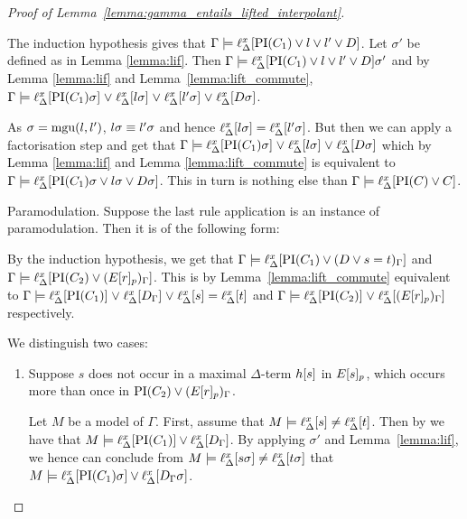 \begin{proof}[Proof of Lemma~\ref{lemma:gamma_entails_lifted_interpolant}]
\begin{description}
			The induction hypothesis gives that
			$\Gamma \models \ell_{\Delta}^{x}[\operatorname{PI}(C_1) \lor l \lor l' \lor D]$.
			Let $\sigma'$ be defined as in Lemma \ref{lemma:lif}.
			Then $\Gamma \models \ell_{\Delta}^{x}[\operatorname{PI}(C_1) \lor l \lor l' \lor D]\sigma'$ and by Lemma \ref{lemma:lif} and Lemma~\ref{lemma:lift_commute},
			$\Gamma \models \ell_{\Delta}^{x}[\operatorname{PI}(C_1)\sigma] \;{\lor}\; \ell_{\Delta}^{x}[l\sigma] \;{\lor}\; \ell_{\Delta}^{x}[l'\sigma] \;{\lor}\; \ell_{\Delta}^{x}[D\sigma]$.

			As $\sigma = \operatorname{mgu}(l, l')$, $l\sigma \equiv l'\sigma$ and hence $\ell_{\Delta}^{x}[l\sigma] = \ell_{\Delta}^{x}[l'\sigma]$.
			But then we can apply a factorisation step and get that
			$\Gamma \models \ell_{\Delta}^{x}[\operatorname{PI}(C_1)\sigma] \;{\lor}\; \ell_{\Delta}^{x}[l\sigma] \;{\lor}\; \ell_{\Delta}^{x}[D\sigma]$
			which by Lemma \ref{lemma:lif} and Lemma \ref{lemma:lift_commute} is equivalent to 
			$\Gamma \entails\nolinebreak \lifdelta{\PI(C_1)\sigma \lor l\sigma \lor D\sigma}$.
			This in turn is nothing else than $\Gamma \models \ell_{\Delta}^{x}[\operatorname{PI}(C) \lor C]$.

		\item{Paramodulation.}
			Suppose the last rule application is an instance of paramodulation. Then it is of the following form:
			\begin{prooftree}
			\end{prooftree}
			By the induction hypothesis, we get that 
			$\Gamma \models \ell_{\Delta}^{x}[\operatorname{PI}(C_1) \lor (D\lor s=t)_\Gamma]$ and 
			$\Gamma \models \ell_{\Delta}^{x}[\operatorname{PI}(C_2) \lor (E{[r]_{p}})_\Gamma]$.
			This is by Lemma~\ref{lemma:lift_commute} equivalent to
			\markA{} $\Gamma \models \ell_{\Delta}^{x}[\operatorname{PI}(C_1)] \;{\lor}\;\allowbreak \ell_{\Delta}^{x}[D_\Gamma] \;{\lor}\; \ell_{\Delta}^{x}[s] = \ell_{\Delta}^{x}[t]$
			and \markB{} 
			$\Gamma \models \ell_{\Delta}^{x}[\operatorname{PI}(C_2)] \;{\lor}\; \ell_{\Delta}^{x}[(E{[r]_{p}})_\Gamma]$ respectively.


				We distinguish two cases:\nopagebreak
				\begin{enumerate}
					\item Suppose $s$ does not occur in a maximal $\Delta$-term $h[s]$ in $E{[s]_{p}}$, which occurs more than once in $\operatorname{PI}(C_2) \lor (E{[r]_{p}})_\Gamma$.
						\label{klehjy}

						Let $M$ be a model of $\Gamma$.
						First, assume that $M \models \ell_{\Delta}^{x}[s] \neq \ell_{\Delta}^{x}[t]$.
						Then by \markA{} we have that $M \models \ell_{\Delta}^{x}[\operatorname{PI}(C_1)] \lor \ell_{\Delta}^{x}[D_\Gamma]$.
						By applying $\sigma'$ and Lemma~\ref{lemma:lif}, we hence can conclude from 
						$M \models \ell_{\Delta}^{x}[s\sigma] \neq \ell_{\Delta}^{x}[t\sigma]$ that 
						$M \models \ell_{\Delta}^{x}[\operatorname{PI}(C_1)\sigma] \lor \ell_{\Delta}^{x}[D_\Gamma\sigma]$.



\end{enumerate}
\end{description}
\end{proof}
